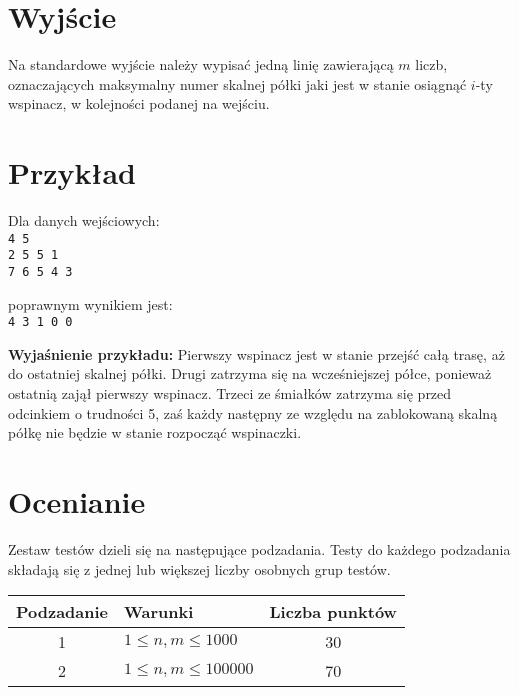 \documentclass[10pt]{article}
\begin{document}

    \section*{Wyjście}
    
    Na standardowe wyjście należy wypisać jedną linię zawierającą $m$ liczb, oznaczających maksymalny numer skalnej półki jaki jest w stanie osiągnąć $i$-ty wspinacz, w kolejności podanej na wejściu.


    \section*{Przykład}
    
    \noindent
    \begin{minipage}[t]{0.5\textwidth}
        Dla danych wejściowych:\vspace{1ex}\\
        \texttt{4 5\\2 5 5 1\\7 6 5 4 3}
    \end{minipage}
    \begin{minipage}[t]{0.5\textwidth}
        poprawnym wynikiem jest:\vspace{1ex}\\
        \texttt{4 3 1 0 0}
    \end{minipage}
    
    \vspace{2ex}
    \noindent\textbf{Wyjaśnienie przykładu:} Pierwszy wspinacz jest w stanie przejść całą trasę, aż do ostatniej skalnej półki. Drugi zatrzyma się na wcześniejszej półce, ponieważ ostatnią zajął pierwszy wspinacz. Trzeci ze śmiałków zatrzyma się przed odcinkiem o trudności 5, zaś każdy następny ze względu na zablokowaną skalną półkę nie będzie w stanie rozpocząć wspinaczki.
    

    \section*{Ocenianie}
        
    Zestaw testów dzieli się na następujące podzadania. Testy do każdego podzadania składają się z jednej lub większej liczby osobnych grup testów.
    
    \begin{center}
        \begin{tabular}{ |c|p{9cm}|c| }
            \hline
            \textbf{Podzadanie} & \textbf{Warunki} & \textbf{Liczba punktów}\\
            \hline
            1 & $1 \leq n, m \leq 1000$ & 30\\
            \hline
            2 & $1 \leq n, m \leq 100000$ & 70\\
            \hline
        \end{tabular}
    \end{center}
\end{document}
